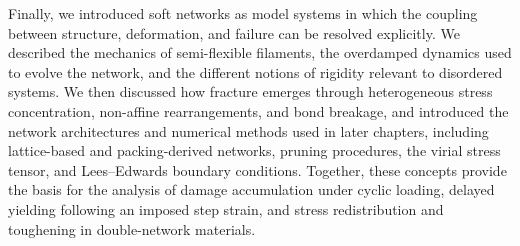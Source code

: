 \documentclass[asymmetricmargins]{library/duthesis}%
\begin{document}
    Finally, we introduced soft networks as model systems in which the coupling between structure, deformation, and failure can be resolved explicitly. We described the mechanics of semi-flexible filaments, the overdamped dynamics used to evolve the network, and the different notions of rigidity relevant to disordered systems. We then discussed how fracture emerges through heterogeneous stress concentration, non-affine rearrangements, and bond breakage, and introduced the network architectures and numerical methods used in later chapters, including lattice-based and packing-derived networks, pruning procedures, the virial stress tensor, and Lees--Edwards boundary conditions. Together, these concepts provide the basis for the analysis of damage accumulation under cyclic loading, delayed yielding following an imposed step strain, and stress redistribution and toughening in double-network materials.
\end{document}
